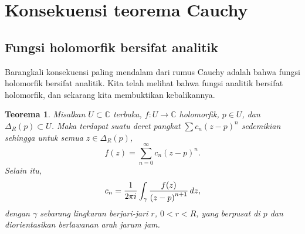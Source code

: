\documentclass[12pt,openany]{book}
\newcommand{\avoidbreak}{\postdisplaypenalty=100}
\newcommand{\C}{{\mathbb{C}}}
\theoremstyle{plain}
\newtheorem{thm}{Teorema}[section]
\theoremstyle{remark}
\theoremstyle{definition}
\theoremstyle{exercise}
\theoremstyle{example}
\begin{document}

\section{Konsekuensi teorema Cauchy}
\label{sec:consequencescauchy}

\subsection{Fungsi holomorfik bersifat analitik}

Barangkali konsekuensi paling mendalam dari rumus Cauchy adalah
bahwa fungsi holomorfik bersifat analitik.  Kita telah melihat
bahwa fungsi analitik bersifat holomorfik, dan sekarang kita membuktikan kebalikannya.

\begin{thm} \label{thm:holpower}
Misalkan $U \subset \C$ terbuka, $f \colon U \to \C$
holomorfik, $p \in U$, dan $\Delta_R(p) \subset U$.
Maka terdapat suatu deret pangkat $\sum c_n {(z-p)}^n$
sedemikian sehingga untuk semua $z \in \Delta_R(p)$,
\begin{equation*}
f(z) = \sum_{n=0}^\infty c_n {(z-p)}^n .
\end{equation*}
Selain itu,
\begin{equation*}
c_n = 
\frac{1}{2\pi i}
\int_{\gamma}
\frac{f(z)}{{(z-p)}^{n+1}}
\,
dz  ,
\avoidbreak
\end{equation*}
dengan $\gamma$ sebarang lingkaran berjari-jari $r$, $0 < r < R$, yang berpusat di
$p$ dan diorientasikan berlawanan arah jarum jam.
\end{thm}
\end{document}
